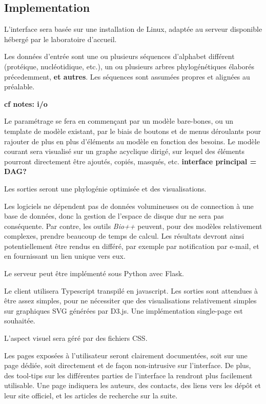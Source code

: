 \subsection{Implementation}

L'interface sera basée sur une installation de Linux,
adaptée au serveur disponible hébergé par le laboratoire d'accueil.

Les données d'entrée sont une ou plusieurs séquences d'alphabet différent
(protéique, nucléotidique, etc.),
un ou plusieurs arbres phylogénétiques élaborés précedemment,
\textbf{et autres}.
Les séquences sont assumées propres et alignées au préalable.

\textbf{cf notes: i/o}

Le paramétrage se fera en commençant par un modèle bare-bones,
ou un template de modèle existant,
par le biais de boutons et de menus déroulants
pour rajouter de plus en plus d'éléments au modèle
en fonction des besoins.
Le modèle courant sera visualisé sur un graphe acyclique dirigé,
sur lequel des éléments pourront directement être ajoutés,
copiés, masqués, etc.
\textbf{interface principal = DAG?}

Les sorties seront une phylogénie optimisée
et des visualisations.

Les logiciels ne dépendent pas de données volumineuses
ou de connection à une base de données,
donc la gestion de l'espace de disque dur ne sera pas conséquente.
Par contre, les outils \textit{Bio++} peuvent,
pour des modèles relativement complexes,
prendre beaucoup de temps de calcul.
Les résultats devront ainsi potentiellement
être rendus en différé,
par exemple par notification par e-mail,
et en fournissant un lien unique vers eux.

Le serveur peut être implémenté sous Python avec Flask.

Le client utilisera Typescript transpilé en javascript.
Les sorties sont attendues à être assez simples,
pour ne nécessiter que des visualisations relativement simples
sur graphiques SVG générées par D3.js.
Une implémentation single-page est souhaitée.

L'aspect visuel sera géré par des fichiers CSS.

Les pages exposées à l'utilisateur seront clairement documentées,
soit sur une page dédiée,
soit directement et de façon non-intrusive sur l'interface.
De plus, des tool-tips sur les différentes parties de l'interface
la rendront plus facilement utilisable.
Une page indiquera les auteurs, des contacts,
des liens vers les dépôt et leur site officiel,
et les articles de recherche sur la suite.

